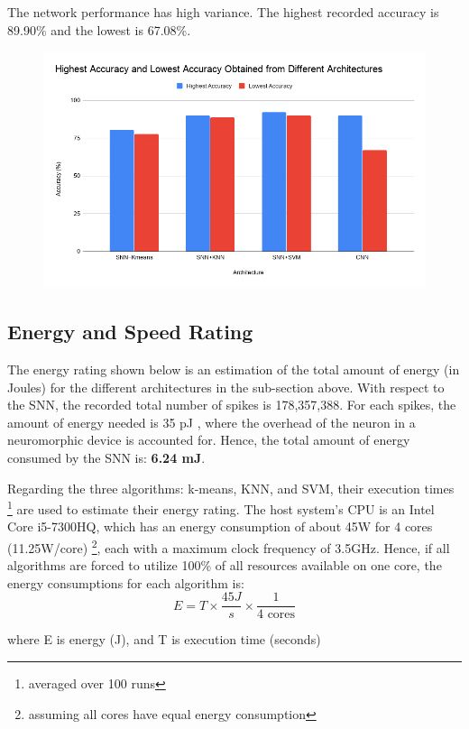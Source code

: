\documentclass[11pt]{article}  %
\begin{document}
The network performance has high variance. The highest recorded accuracy is 89.90\% and the lowest is 67.08\%.

\begin{figure}
	\centering
	\includegraphics[width=0.7\linewidth]{"accuracy rating"}
	\caption{}
	\label{fig:accuracy-rating}
\end{figure}


\subsection{Energy and Speed Rating}

The energy rating shown below is an estimation of the total amount of energy (in Joules) for the different architectures in the sub-section above. With respect to the SNN, the recorded total number of spikes is 178,357,388. For each spikes, the amount of energy needed is 35 pJ \cite{b9}, where the overhead of the neuron in a neuromorphic device is accounted for. Hence, the total amount of energy consumed by the SNN is: \textbf{6.24 mJ}.

Regarding the three algorithms: k-means, KNN, and SVM, their execution times \footnote{averaged over 100 runs} are used to estimate their energy rating. The host system's CPU is an Intel Core i5-7300HQ, which has an energy consumption of about 45W for 4 cores (11.25W/core) \footnote{assuming all cores have equal energy consumption}, each with a maximum clock frequency of 3.5GHz. Hence, if all algorithms are forced to utilize 100\% of all resources available on one core, the energy consumptions for each algorithm is:
\begin{equation}
	E = T \times \frac{45J}{s} \times \frac{1}{\text{4 cores}}
\end{equation}

where E is energy (J), and T is execution time (seconds)
\end{document}
